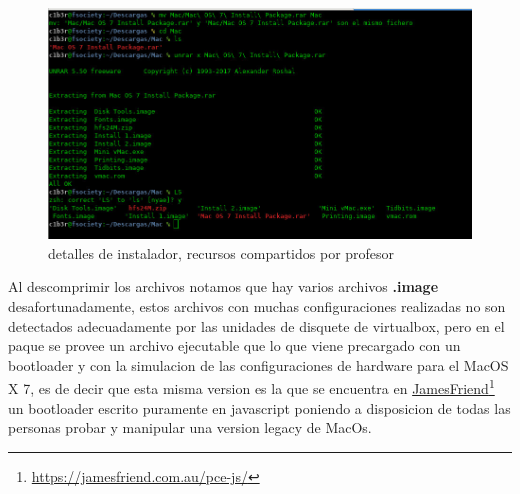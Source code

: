 \documentclass[paper=a4, fontsize=12pt]{article} 		%
\newcommand\fnurl[2]{%
\href{#2}{#1}\footnote{\url{#2}}%
}
\numberwithin{equation}{section}						%
\numberwithin{table}{section} 							%
\begin{document}
\begin{center}
\begin{figure}[H]
\includegraphics[scale=0.4]{img/mac.jpg}
\caption{detalles de instalador, recursos compartidos por profesor}
\label{fig:installer}
\end{figure}
\end{center}
Al descomprimir los archivos notamos que hay varios archivos \textbf{.image} desafortunadamente, estos archivos con muchas configuraciones realizadas no son detectados adecuadamente por las unidades de disquete de virtualbox, pero en el paque se provee 
un archivo ejecutable que lo que viene precargado con un bootloader y con la simulacion de las configuraciones de hardware para el MacOS X 7, es de decir que esta misma version es la que se encuentra en \fnurl{JamesFriend}{https://jamesfriend.com.au/pce-js/} un bootloader escrito puramente en javascript poniendo a disposicion de todas las personas probar y manipular una version legacy de MacOs.
\end{document}
